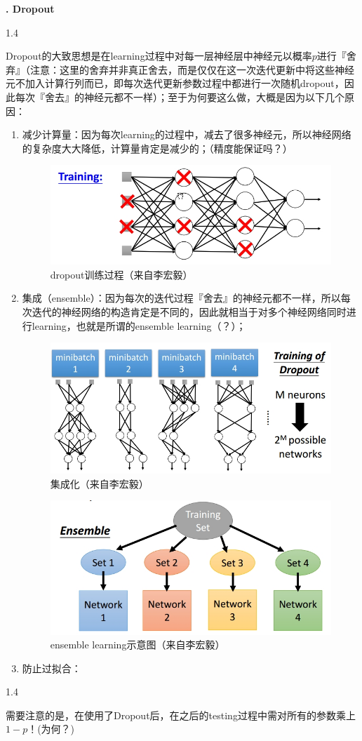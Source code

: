 \documentclass{article}
\newcounter{x2}%
\newcounter{x3}[x2]
\newcounter{x4}[x3]
\newcounter{x5}[x4]
\newcommand{\updateCounter}[2]{\stepcounter{#1}\setcounter{#2}{1}}
\newcommand{\TP}[1]{\begin{spacing}{1.4}\par{#1}\end{spacing}}
\newcommand{\TL}[1]{\begin{flushleft}#1\end{flushleft}}
\newcommand{\xxxx}[1]{\TL{\fontsize{16pt}{0}\textbf{\yh\arabic{x4}. #1}\\[1.5em]}\updateCounter{x4}{x5}}
\begin{document}
	\xxxx{Dropout}
	\TP{Dropout的大致思想是在learning过程中对每一层神经层中神经元以概率$p$进行『舍弃』（注意：这里的舍弃并非真正舍去，而是仅仅在这一次迭代更新中将这些神经元不加入计算行列而已，即每次迭代更新参数过程中都进行一次随机dropout，因此每次『舍去』的神经元都不一样）；至于为何要这么做，大概是因为以下几个原因：}
	\begin{enumerate}
		\item 减少计算量：因为每次learning的过程中，减去了很多神经元，所以神经网络的复杂度大大降低，计算量肯定是减少的；（精度能保证吗？）
		\begin{figure}[ht]
			\centering
			\includegraphics[scale=0.6]{dl_4.jpg}
			\caption{dropout训练过程（来自李宏毅）}
		\end{figure}
		\item 集成（ensemble）：因为每次的迭代过程『舍去』的神经元都不一样，所以每次迭代的神经网络的构造肯定是不同的，因此就相当于对多个神经网络同时进行learning，也就是所谓的ensemble learning（？）；
		\begin{figure}[ht]
			\centering
			\includegraphics[scale=0.6]{dl_6.jpg}
			\caption{集成化（来自李宏毅）}
		\end{figure}
		\begin{figure}[ht]
			\centering
			\includegraphics[scale=0.6]{dl_5.jpg}
			\caption{ensemble learning示意图（来自李宏毅）}
		\end{figure}
		\item 防止过拟合：
	\end{enumerate}
	\TP{需要注意的是，在使用了Dropout后，在之后的testing过程中需对所有的参数乘上$1-p$！(为何？)}
	
\end{document}
